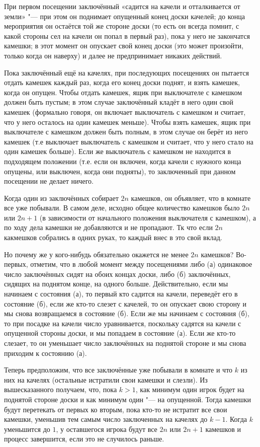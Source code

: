 \documentclass[twoside]{book}
\begin{document}
При первом посещении заключённый «садится на качели и отталкивается от
земли» "--- при этом он поднимает опущенный конец доски качелей;
до конца мероприятия он остаётся той же стороне доски (то есть он
всегда помнит, с какой стороны сел на качели он попал в первый раз), пока у него не закончатся камешки; в этот момент он опускает свой конец доски (это может произойти, только когда он наверху) и далее не предпринимает никаких действий.

Пока заключённый ещё на качелях, при последующих посещениях он
пытается отдать камешек каждый раз, когда его конец доски поднят, и
взять камешек, когда он опущен.
Чтобы отдать камешек, ящик при
выключателе с камешком должен быть пустым; в этом случае заключённый
кладёт в него один свой камешек (формально говоря, он включает
выключатель с камешком и считает, что у него осталось на один камешек
меньше).
Чтобы взять камешек, ящик при выключателе с камешком должен
быть полным, в этом случае он берёт из него камешек (т.е выключает
выключатель с камешком и считает, что у него стало на один камешек
больше).
Если же выключатель с камешком не находится в подходящем
положении (т.е. если он включен, когда качели с нужного конца опущены,
или выключен, когда они подняты), то заключенный при данном посещении
не делает ничего.

Когда один из заключённых собирает $2n$ камешков, он объявляет, что в комнате все уже побывали.
В самом деле, исходно общее количество камешков было $2n$ или $2n+1$
(в зависимости от начального положения выключателя с камешком), а по
ходу дела камешки не добавляются и не пропадают. Тк что если $2n$
какмешков собрались в одних руках, то каждый внес в это свой вклад.

Но почему же у кого-нибудь обязательно окажется не менее $2n$ камешков?
Во-первых, отметим, что в любой момент между посещениями либо 
(а) одинаковое число заключённых сидят на обоих концах доски, либо 
(б) заключённых, сидящих на поднятом конце, на одного больше.
Действительно, если мы начинаем с состояния (а), то первый кто садится на качели, переведёт его в состояние (б), если же кто-то слезет с качелей, то он опускает свою сторону и мы  снова возвращаемся в состояние (б).
Если же мы начинаем с состояния (б), то при посадке на качели число уравнивается, поскольку садятся на качели с опущенной стороны доски, и мы попадаем в состояние (а).
Если же кто-то слезает, то он уменьшает число заключённых на поднятой стороне и мы снова приходим к состоянию (а).

Теперь предположим, что все заключённые уже побывали в комнате и что $k$ из них на качелях (остальные истратили свои камешки и слезли).
Из вышесказанного получаем, что, пока $k>1$, как минимум один игрок будет на поднятой стороне доски и как минимум один "--- на опущенной.
Тогда камешки будут перетекать от первых ко вторым, пока кто-то не
истратит все свои камешки, уменьшив тем самым число заключенных на качелях до $k-1$.
Когда $k$ уменьшится до $1$, у оставшегося игрока будут все $2n$ или $2n+1$ камешков и процесс завершится, если это не случилось раньше.
\heart
\end{document}
